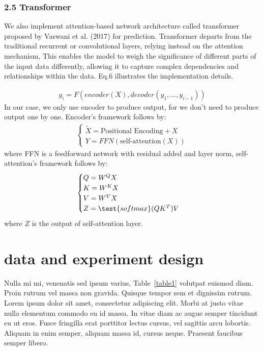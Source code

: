 \documentclass[10pt,letterpaper]{article}
\begin{document}
\subsubsection* {2.5 Transformer}
We also implement attention-based network architecture called transformer proposed by Vaswani et al. (2017) for prediction. Transformer departs from the traditional recurrent or convolutional layers, relying instead on the attention mechanism, This enables the model to weigh the significance of different parts of the input data differently, allowing it to capture complex dependencies and relationships within the data. Eq.6 illustrates the implementation details.

\begin{eqnarray}
\label{eq: Transformer}
    y_i = F(encoder(X), decoder(y_1,...,y_{i - 1}))
\end{eqnarray}
In our case, we only use encoder to produce output, for we don't need to produce output one by one. Encoder's framework follows by:
\begin{eqnarray}
\label{eq: TransformerDecoder}
    \begin {cases} \tilde{X} = \text{Positional Encoding} + X
    \\Y = FFN(\text{self-attention}(X))
    \end {cases}
\end{eqnarray}
where FFN is a feedforward network with residual added and layer norm, self-attention's framework follows by:
\begin{eqnarray}
\label{eq: self-attention}
    \begin {cases} Q = W^QX
    \\K = W^KX
    \\V = W^VX
    \\Z = \test{softmax}(QK^T)V
    \end {cases}
\end{eqnarray}
where $Z$ is the output of self-attention layer.

\section*{data and experiment design}
Nulla mi mi, venenatis sed ipsum varius, Table~\ref{table1} volutpat euismod diam. Proin rutrum vel massa non gravida. Quisque tempor sem et dignissim rutrum. Lorem ipsum dolor sit amet, consectetur adipiscing elit. Morbi at justo vitae nulla elementum commodo eu id massa. In vitae diam ac augue semper tincidunt eu ut eros. Fusce fringilla erat porttitor lectus cursus, vel sagittis arcu lobortis. Aliquam in enim semper, aliquam massa id, cursus neque. Praesent faucibus semper libero.
\end{document}
